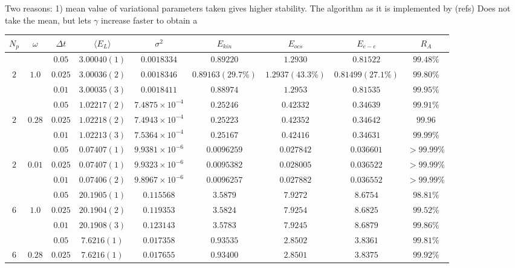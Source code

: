 \documentclass[a4paper,10pt,twocolumn]{article} %
\newcommand{\expec}[1]{\langle{}{#1}\rangle{}}
\begin{document}
Two reasons: 1) mean value of variational parameters taken gives higher stability.
The algorithm as it is implemented by (refs) Does not take the mean, but lets $\gamma$ increase faster to obtain a 

\begin{table*}[ht!]
\begin{center}
\begin{tabular}{|c|c|c|c|c|c|c|c|c|}
\hline
$N_{p}$ & $\omega$ & $\Delta t$ & $\expec{E_L}$ & $\sigma^2$ & $E_{kin}$ & $E_{ocs}$ & $E_{e-e}$ & $R_A$\\ 
\hline
\hline
  &  			& $0.05$  & $3.00040(1)$ & $0.0018334$ & $0.89220$ & $1.2930$ & $0.81522$ & $99.48\%$\\ 
$ 2 $ & $1.0$& $0.025$ & $3.00036(2)$ & $0.0018346$ & $0.89163(29.7\%)$ & $1.2937(43.3\%)$ & $0.81499(27.1\%)$ & $99.80\%$\\ 
  & 		 	& $0.01$  & $3.00035(3)$ & $0.0018411$ & $0.88974$ & $1.2953$ & $0.81535$ & $99.95\%$\\ 
\hline
  	& 	 		& $0.05$   & $1.02217(2)$ & $7.4875\times10^{-4}$ & $0.25246$ & $0.42332$ & $0.34639$ & $99.91\%$\\ 
$2$ & $0.28$&  	$0.025$  & $1.02218(2)$ & $7.4943\times10^{-4}$ & $0.25223$ & $0.42352$ & $0.34642$ & $99.96$\\ 
  	& 	 		& $0.01$   & $1.02213(3)$ & $7.5364\times10^{-4}$ & $0.25167$ & $0.42416$ & $0.34631$ & $99.99\%$\\ 
\hline
  &  			& $0.05$   & $0.07407(1)$ & $9.9381\times10^{-6}$ & $0.0096259$ & $0.027842$ & $0.036601$ & $>99.99\%$\\ 
$2$&$0.01$ 	& $0.025$  & $0.07407(1)$ & $9.9323\times10^{-6}$ & $0.0095382$ & $0.028005$ & $0.036522$ & $>99.99\%$\\ 
  & 			& $0.01$   & $0.07406(2)$ & $9.8967\times10^{-6}$ & $0.0096257$ & $0.027882$ & $0.036552$ & $>99.99\%$\\ 
\hline
\hline
 	 & 			& $0.05$  & $20.1905(1)$ & $0.115568$ & $3.5879$ & $7.9272$ & $8.6754$ & $98.81\%$\\ 
 $6$ & 	$1.0$	& $0.025$ & $20.1904(2)$ & $0.119353$ & $3.5824$ & $7.9254$ & $8.6825$ & $99.52\%$\\ 
 	 & 		 	& $0.01$  & $20.1908(3)$ & $0.123143$ & $3.5783$ & $7.9245$ & $8.6879$ & $99.86\%$\\ 
\hline
 	 &  		& $0.05$  & $7.6216(1)$ & $0.017358$ & $0.93535$ & $2.8502$ & $3.8361$ & $99.81\%$\\
 $6$ &  $0.28$	& $0.025$ & $7.6216(1)$ & $0.017655$ & $0.93400$ & $2.8501$ & $3.8375$ & $99.92\%$\\ 

\end{tabular}
\end{center}
\end{table*}
\end{document}
